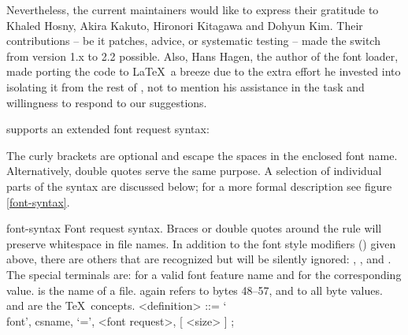 Nevertheless, the current maintainers would like to express their
gratitude to Khaled Hosny, Akira Kakuto, Hironori Kitagawa and Dohyun
Kim.
%
Their contributions -- be it patches, advice, or systematic
testing -- made the switch from version 1.x to 2.2 possible.
%
Also, Hans Hagen, the author of the font loader, made porting the
code to \LaTeX\ a breeze due to the extra effort he invested into
isolating it from the rest of \ConTeXt, not to mention his assistance
in the task and willingness to respond to our suggestions.

\endsection


 supports an extended font request syntax:

\beginnarrower
\endnarrower

\noindent
The curly brackets are optional and escape the spaces in the enclosed
font name.
%
Alternatively, double quotes serve the same purpose.
%
A selection of individual parts of the syntax are discussed below;
for a more formal description see figure \ref{font-syntax}.

\beginsyntaxfloat
  {font-syntax}
  {Font request syntax.
   Braces or double quotes around the
    rule will
   preserve whitespace in file names.
   In addition to the font style modifiers
   () given above, there
   are others that are recognized but will be silently
   ignored: ,
            , and
            .
   The special terminals are:
    for a valid font
      feature name and
    for the corresponding
      value.
    is the name of a  file.
     again refers to bytes 48--57, and
    to all byte values.
    and  are the \TeX\ concepts.}
%
      <definition>      ::= `\\font', {\sc csname}, `=', <font request>, [ <size> ] ;

